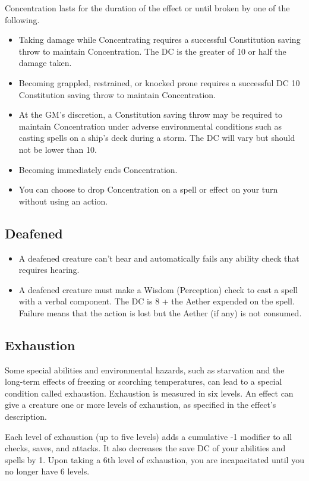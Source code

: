 Concentration lasts for the duration of the effect or until broken by one of the following.
\begin{itemize}
	\item Taking damage while Concentrating requires a successful Constitution saving throw to maintain Concentration. The DC is the greater of  10 or half the damage taken.
	\item Becoming grappled, restrained, or knocked prone requires a successful DC 10 Constitution saving throw to maintain Concentration.
	\item At the GM's discretion, a Constitution saving throw may be required to maintain Concentration under adverse environmental conditions such as casting spells on a ship's deck during a storm. The DC will vary but should not be lower than 10.
	\item Becoming  immediately ends Concentration.
	\item You can choose to drop Concentration on a spell or effect on your turn without using an action.
\end{itemize}

\subsection{Deafened\label{condition:deafened}}
\begin{itemize}
\item A deafened creature can't hear and automatically fails any ability check that requires hearing.
\item A deafened creature must make a Wisdom (Perception) check to cast a spell with a verbal component. The DC is 8 + the Aether expended on the spell. Failure means that the action is lost but the Aether (if any) is not consumed.
\end{itemize}

\subsection{Exhaustion\label{condition:exhaustion}}

Some special abilities and environmental hazards, such as starvation and the long-term effects of freezing or scorching temperatures, can lead to a special condition called exhaustion. Exhaustion is measured in six levels. An effect can give a creature one or more levels of exhaustion, as specified in the effect's description.

Each level of exhaustion (up to five levels) adds a cumulative -1 modifier to all checks, saves, and attacks. It also decreases the save DC of your abilities and spells by 1. Upon taking a 6th level of exhaustion, you are incapacitated until you no longer have 6 levels.

